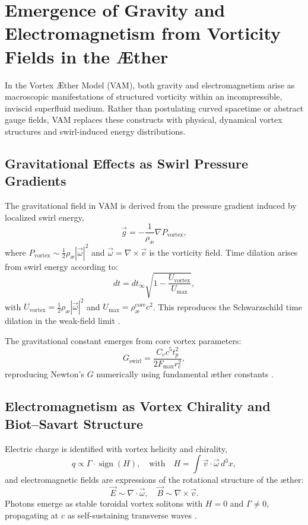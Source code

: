 \section{Emergence of Gravity and Electromagnetism from Vorticity Fields in the Æther}

In the Vortex Æther Model (VAM), both gravity and electromagnetism arise as macroscopic manifestations of structured vorticity within an incompressible, inviscid superfluid medium. Rather than postulating curved spacetime or abstract gauge fields, VAM replaces these constructs with physical, dynamical vortex structures and swirl-induced energy distributions.

\subsection{Gravitational Effects as Swirl Pressure Gradients}

The gravitational field in VAM is derived from the pressure gradient induced by localized swirl energy,
\begin{equation}
\vec{g} = -\frac{1}{\rho_\text{\ae}} \nabla P_{\text{vortex}},
\end{equation}
where $P_{\text{vortex}} \sim \frac{1}{2} \rho_\text{\ae} |\vec{\omega}|^2$ and $\vec{\omega} = \nabla \times \vec{v}$ is the vorticity field. Time dilation arises from swirl energy according to:
\begin{equation}
dt = dt_\infty \sqrt{1 - \frac{U_{\text{vortex}}}{U_{\text{max}}}},
\end{equation}
with $U_{\text{vortex}} = \frac{1}{2} \rho_\text{\ae} |\vec{\omega}|^2$ and $U_{\text{max}} = \rho_\text{\ae}^\text{core} c^2$. This reproduces the Schwarzschild time dilation in the weak-field limit \cite{MTW1973}.

The gravitational constant emerges from core vortex parameters:
\begin{equation}
G_\text{swirl} = \frac{C_e c^5 t_p^2}{2 F_{\text{max}} r_c^2},
\end{equation}
reproducing Newton's $G$ numerically using fundamental æther constants \cite{Iskandarani2025VAM}.

\subsection{Electromagnetism as Vortex Chirality and Biot–Savart Structure}

Electric charge is identified with vortex helicity and chirality,
\begin{equation}
q \propto \Gamma \cdot \operatorname{sign}(H), \quad \text{with} \quad H = \int \vec{v} \cdot \vec{\omega} \, d^3x,
\end{equation}
and electromagnetic fields are expressions of the rotational structure of the æther:
\begin{equation}
\vec{E} \sim \nabla \cdot \vec{\omega}, \quad \vec{B} \sim \nabla \times \vec{v}.
\end{equation}
Photons emerge as stable toroidal vortex solitons with $H = 0$ and $\Gamma \neq 0$, propagating at $c$ as self-sustaining transverse waves \cite{Battye1998, Ranada1989}.

